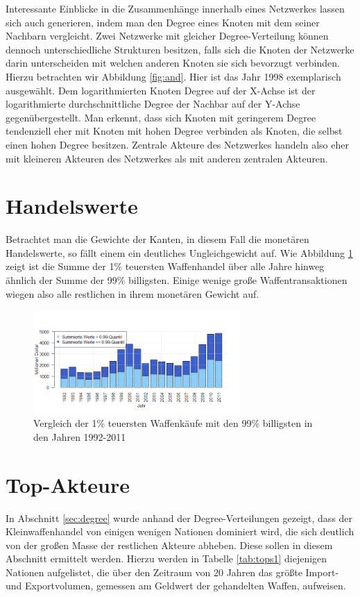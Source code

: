 \documentclass[a4paper,ngerman,oneside,titlepage,bibliography=totoc,11pt]{scrreprt}
\begin{document}
Interessante Einblicke in die Zusammenhänge innerhalb eines Netzwerkes lassen sich auch generieren, indem man den Degree eines Knoten mit dem seiner Nachbarn vergleicht. Zwei Netzwerke mit gleicher Degree-Verteilung können dennoch unterschiedliche Strukturen besitzen, falls sich die Knoten der Netzwerke darin unterscheiden mit welchen anderen Knoten sie sich bevorzugt verbinden. Hierzu betrachten wir Abbildung \ref{fig:and}. Hier ist das Jahr 1998 exemplarisch ausgewählt. Dem logarithmierten Knoten Degree auf der X-Achse ist der logarithmierte durchschnittliche Degree der Nachbar auf der Y-Achse gegenübergestellt. Man erkennt, dass sich Knoten mit geringerem Degree tendenziell eher mit Knoten mit hohen Degree verbinden als Knoten, die selbst einen hohen Degree besitzen. Zentrale Akteure des Netzwerkes handeln also eher mit kleineren Akteuren des Netzwerkes als mit anderen zentralen Akteuren.


\section{Handelswerte}


Betrachtet man die Gewichte der Kanten, in diesem Fall die monetären Handelswerte, so fällt einem ein deutliches Ungleichgewicht auf. Wie Abbildung \ref{fig:ts_value} zeigt ist die Summe der 1\% teuersten Waffenhandel über alle Jahre hinweg ähnlich der Summe der 99\% billigsten. Einige wenige große Waffentransaktionen wiegen also alle restlichen in ihrem monetären Gewicht auf. 
\begin{figure}[ht]
	\centering
		\includegraphics[width=0.7\textwidth]{Grafiken/ts_value.png}
	\caption{Vergleich der 1\% teuersten Waffenkäufe mit den 99\% billigsten in den Jahren 1992-2011}
	\label{fig:ts_value}
\end{figure}

\section{Top-Akteure}
\label{sec:top-akteure}
In Abschnitt \ref{sec:degree} wurde anhand der Degree-Verteilungen gezeigt, dass der Kleinwaffenhandel von einigen wenigen Nationen dominiert wird, die sich deutlich von der großen Masse der restlichen Akteure abheben. Diese sollen in diesem Abschnitt ermittelt werden. Hierzu werden in Tabelle \ref{tab:tops1} diejenigen Nationen aufgelistet, die über den Zeitraum von 20 Jahren das größte Import- und Exportvolumen, gemessen am Geldwert der gehandelten Waffen, aufweisen. 
\end{document}

